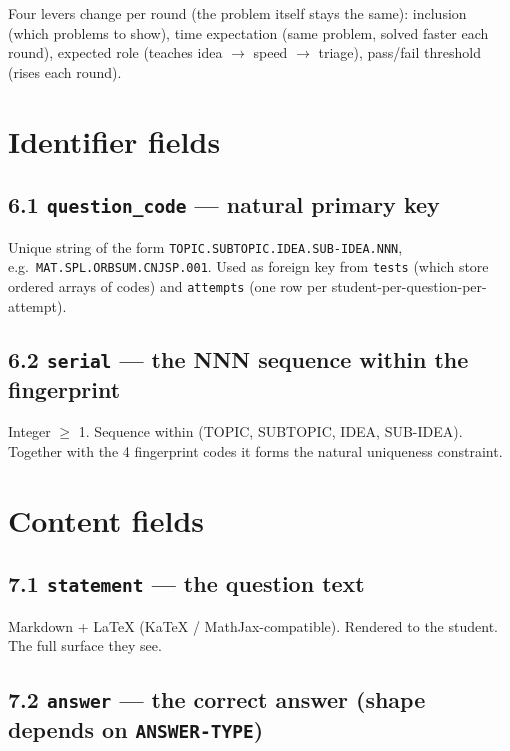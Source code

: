 \documentclass[11pt,letterpaper]{article}
\newcommand{\cd}[1]{\texttt{\small #1}}
\begin{document}
Four levers change per round (the problem itself stays the same): inclusion (which problems to show), time expectation (same problem, solved faster each round), expected role (teaches idea $\to$ speed $\to$ triage), pass/fail threshold (rises each round).

\section{Identifier fields}\label{sec:id}

\subsection*{6.1 \cd{question\_code} --- natural primary key}

Unique string of the form \cd{TOPIC.SUBTOPIC.IDEA.SUB-IDEA.NNN}, e.g.\ \cd{MAT.SPL.ORBSUM.CNJSP.001}. Used as foreign key from \cd{tests} (which store ordered arrays of codes) and \cd{attempts} (one row per student-per-question-per-attempt).

\subsection*{6.2 \cd{serial} --- the NNN sequence within the fingerprint}

Integer $\geq$ 1. Sequence within (TOPIC, SUBTOPIC, IDEA, SUB-IDEA). Together with the 4 fingerprint codes it forms the natural uniqueness constraint.

\section{Content fields}\label{sec:content}

\subsection*{7.1 \cd{statement} --- the question text}

Markdown + LaTeX (KaTeX / MathJax-compatible). Rendered to the student. The full surface they see.

\subsection*{7.2 \cd{answer} --- the correct answer (shape depends on \cd{ANSWER-TYPE})}
\end{document}
